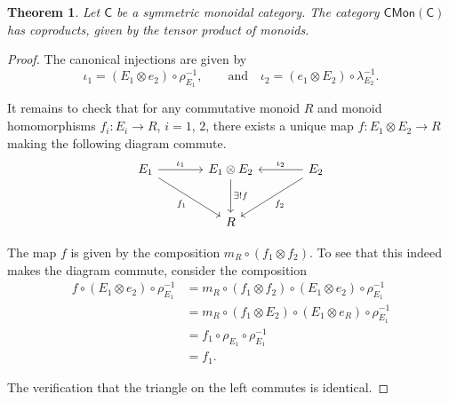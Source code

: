 \documentclass[a4paper,10pt]{scrreprt}
\theoremstyle{definition}
\theoremstyle{plain}
\newtheorem{theorem}{Theorem}[section]
\theoremstyle{remark}
\begin{document}
\begin{theorem}
  \label{thm:tensorproductiscoproductincategoryofcommutativemonoids}
  Let $\mathsf{C}$ be a symmetric monoidal category. The category $\mathsf{CMon}(\mathsf{C})$ has coproducts, given by the tensor product of monoids.
\end{theorem}
\begin{proof}
  The canonical injections are given by 
  \begin{equation*}
    \iota_{1} = (E_{1} \otimes e_{2}) \circ \rho_{E_{1}}^{-1},\qquad\text{and}\quad \iota_{2} = (e_{1} \otimes E_{2}) \circ \lambda_{E_{2}}^{-1}.
  \end{equation*}

  It remains to check that for any commutative monoid $R$ and monoid homomorphisms $f_{i}\colon E_{i} \to R$, $i = 1$, $2$, there exists a unique map $f\colon E_{1} \otimes E_{2} \to R$ making the following diagram commute.
  \begin{equation*}
    \begin{tikzcd}[row sep=large, column sep=large]
      E_{1}
      \arrow[r, "\iota_{1}"]
      \arrow[rd, swap, "f_{1}"]
      & E_{1} \otimes E_{2}
      \arrow[d, "\exists!f"]
      & E_{2}
      \arrow[l, swap, "\iota_{2}"]
      \arrow[ld, "f_{2}"]
      \\
      & R
    \end{tikzcd}
  \end{equation*}

  The map $f$ is given by the composition $m_{R} \circ (f_{1} \otimes f_{2})$. To see that this indeed makes the diagram commute, consider the composition
  \begin{align*}
    f \circ (E_{1} \otimes e_{2}) \circ \rho_{E_{1}}^{-1} &= m_{R} \circ (f_{1} \otimes f_{2}) \circ (E_{1} \otimes e_{2}) \circ \rho_{E_{1}}^{-1} \\
    &= m_{R} \circ (f_{1} \otimes E_{2}) \circ (E_{1} \otimes e_{R}) \circ \rho_{E_{1}}^{-1} \\
    &= f_{1} \circ \rho_{E_{1}} \circ \rho_{E_{1}}^{-1} \\
    &= f_{1}.
  \end{align*}

  The verification that the triangle on the left commutes is identical.


\end{proof}
\end{document}
